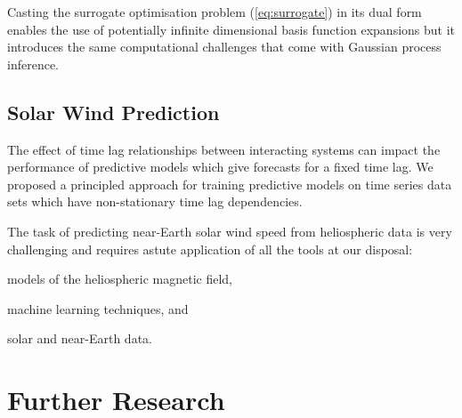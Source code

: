 Casting the surrogate optimisation problem (\cref{eq:surrogate}) in its dual form enables the use 
of potentially infinite dimensional basis function expansions but it introduces the same 
computational challenges that come with Gaussian process inference. 

\subsection*{Solar Wind Prediction}

The effect of time lag relationships between interacting systems can impact the performance of 
predictive models which give forecasts for a fixed time lag. We proposed a principled approach for 
training predictive models on time series data sets which have non-stationary time lag dependencies.

The task of predicting near-Earth solar wind speed from heliospheric data is very challenging and 
requires astute application of all the tools at our disposal: 
\begin{enumerate*} 
    \item models of the heliospheric magnetic field,
    \item machine learning techniques, and 
    \item solar and near-Earth data. 
\end{enumerate*}


\section{Further Research}

